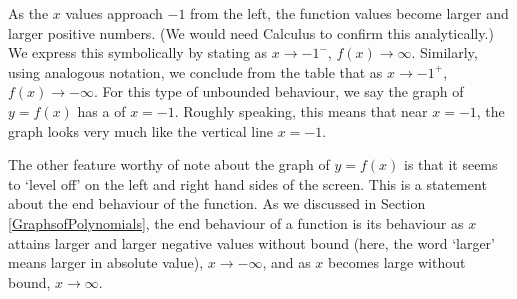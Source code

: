 As the $x$ values approach $-1$ from the left, the function values become larger and larger positive numbers. (We would need Calculus to confirm this analytically.)  We express this symbolically by stating as $x \rightarrow -1^{-}$, $f(x) \rightarrow \infty$.   Similarly, using analogous notation, we conclude from the table that as $x \rightarrow -1^{+}$, $f(x) \rightarrow -\infty$.  For this type of unbounded behaviour, we say the graph of $y=f(x)$ has a  of $x = -1$.  Roughly speaking, this means that near $x=-1$, the graph looks very much like the vertical line $x=-1$. 

\smallskip

The other feature worthy of note about the graph of $y=f(x)$ is that it seems to `level off' on the left and right hand sides of the screen.  This is a statement about the end behaviour of the function.  As we discussed in Section \ref{GraphsofPolynomials}, the end behaviour of a function is its behaviour as $x$ attains larger and larger negative values without bound (here, the word `larger' means larger in absolute value), $x \rightarrow -\infty$, and as $x$ becomes large without bound, $x \rightarrow \infty$.  


